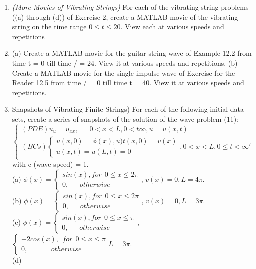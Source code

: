 \documentclass[../main.tex]{subfiles}
\begin{document}
\begin{enumerate}
{View each at various speeds and repetitions. }
	\item 
		{\textit{(More Movies of Vibrating Strings)} For each of the vibrating string problems ((a) through (d)) 
of Exercise 2, create a MATLAB movie of the vibrating string on the time range $0 \leqslant t \leqslant 20$. 
View each at various speeds and repetitions}
	\item
		(a) Create a MATLAB movie for the guitar string wave of Example 12.2 from time t = 0 till 
time / = 24. View it at various speeds and repetitions. 
(b) Create a MATLAB movie for the single impulse wave of Exercise for the Reader 12.5 from 
time / = 0 till time t = 40. View it at various speeds and repetitions. 
	\item
	{Snapshots of Vibrating Finite Strings) For each of the following initial data sets, create a series 
of snapshots of the solution of the wave problem (11):\\
$$\begin{cases} 
	(PDE) u_u=u_{xx}, ~~~~~~~ 0< x< L, 0<t \infty , u=u(x,t) \\ 
	(BCs) 
\begin{cases}
	u(x,0)=\phi(x) , u)t(x,0)=v(x)\\
	u(x,t)=u(L,t)=0
\end{cases}, 
	0<x<L, 0\leqslant t< \infty '
\end{cases}$$}
with c (wave speed) = 1. 
\\
(a)
$\phi(x)=
\begin{cases} 
	sin(x), for~~ 0\leqslant  x\leqslant 2 \pi \\
	0, ~~~~~~~otherwise
\end{cases}$, 
	$v(x)=0 , L=4 \pi$.
\\
(b)
$\phi(x)=
\begin{cases} 
	sin(x), for~~ 0\leqslant  x\leqslant 2 \pi \\
	0, ~~~~~~~otherwise
\end{cases}$, 
	$v(x)=0 , L=3 \pi$.
\\
(c)
$\phi(x)=
\begin{cases} 
	sin(x), for~~ 0\leqslant  x\leqslant  \pi \\
	0, ~~~~~~~otherwise
\end{cases}$, 
	$\begin{cases} 
		-2cos(x), ~~for~~ 0 \leqslant x \leqslant \pi \\	
		0, ~~~~~~~~~~~~~~~otherwise
	\end{cases}
		L=3 \pi$.
\\
(d)

\end{enumerate}
\end{document}
